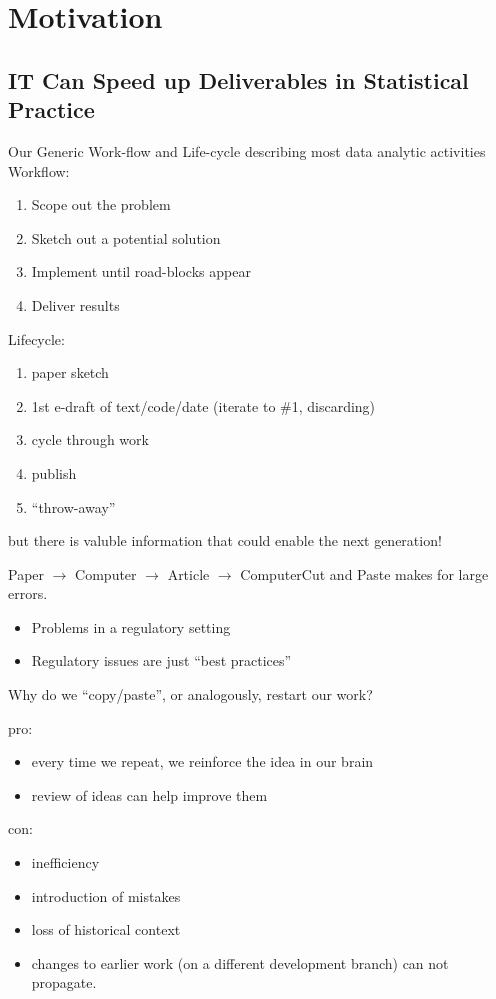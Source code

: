 \documentclass{beamer}
\begin{document}
\section{Motivation}

\subsection{IT Can Speed up Deliverables in Statistical Practice}

\begin{frame}{Our Generic Work-flow and Life-cycle}
  {describing most data analytic activities}
  Workflow:
  \begin{enumerate}
  \item Scope out the problem
  \item Sketch out a potential solution
  \item Implement until road-blocks appear
  \item Deliver results 
  \end{enumerate}

  Lifecycle:
  \begin{enumerate}
  \item paper sketch
  \item 1st e-draft of text/code/date (iterate to \#1, discarding)
  \item cycle through work
  \item publish
  \item ``throw-away''
  \end{enumerate}
  but there is valuble information that could enable the next
  generation!
\end{frame}

\begin{frame}[fragile]{Paper $\rightarrow$ Computer  $\rightarrow$ Article $\rightarrow$ Computer}{Cut and Paste makes for large errors.}
  \begin{itemize}
  \item Problems in a regulatory setting
  \item Regulatory issues are just ``best practices''
  \end{itemize}

  Why do we ``copy/paste'', or analogously, restart our work?

  pro:
  \begin{itemize}
  \item every time we repeat, we reinforce the idea in our brain
  \item review of ideas can help improve them
  \end{itemize}
  con:
  \begin{itemize}
  \item inefficiency
  \item introduction of mistakes
  \item loss of historical context
  \item changes to earlier work (on a different development branch)
    can not propagate. 
  \end{itemize}
\end{frame}
\end{document}
